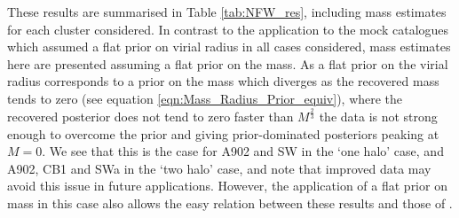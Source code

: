 \documentclass[useAMS,usenatbib,times,letter,amssymb]{mn2e}
\begin{document}
These results are summarised in Table \ref{tab:NFW_res}, including mass estimates for each cluster considered. In contrast to the application to the mock catalogues which assumed a flat prior on virial radius in all cases considered, mass estimates here are presented assuming a flat prior on the mass. As a flat prior on the virial radius corresponds to a prior on the mass which diverges as the recovered mass tends to zero (see equation \ref{eqn:Mass_Radius_Prior_equiv}), where the recovered posterior does not tend to zero faster than $M^\frac{2}{3}$ the data is not strong enough to overcome the prior and giving prior-dominated posteriors peaking at $M=0$. We see that this is the case for A902 and SW in the `one halo' case, and A902, CB1 and SWa in the `two halo' case, and note that improved data may avoid this issue in future applications. However, the application of a flat prior on mass in this case also allows the easy relation between these results and those of \cite{Heymans:2008p2060}.
\end{document}
